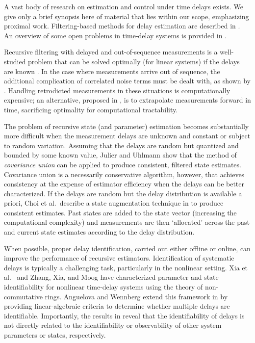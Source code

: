 \documentclass[letterpaper,10pt,conference]{ieeeconf}
\theoremstyle{definition}
\begin{document}
A vast body of research on estimation and control under time delays exists.
%
We give only a brief synopsis here of material that lies within our scope, emphasizing  proximal work. Filtering-based methods for delay estimation are described in .
%
An overview of some open problems in time-delay systems is provided in \cite{2003_Richard_Time-Delay}.

Recursive filtering with delayed and out-of-sequence measurements is a well-studied problem that can be solved optimally (for linear systems) if the delays are known \cite{2006_Simon_Optimal}.
%
In the case where measurements arrive out of sequence, the additional complication of correlated noise terms must be dealt with, as shown by \cite{1994_Thomopoulos_Decentralized}.
%
Handling retrodicted measurements in these situations is computationally expensive; an alternative, proposed in \cite{1998_Larsen_Incorporation}, is to extrapolate measurements forward in time, sacrificing optimality for computational tractability.

The problem of recursive state (and parameter) estimation becomes substantially more difficult when the measurement delays are unknown and constant or subject to random variation.
%
Assuming that the delays are random but quantized and bounded by some known value, Julier and Uhlmann \cite{2005_Julier_Fusion} show that the method of \emph{covariance union} can be applied to produce consistent, filtered state estimates.
%
Covariance union is a necessarily conservative algorithm, however, that achieves consistency at the expense of estimator efficiency when the delays can be better characterized.
%
If the delays are random but the delay distribution is available a priori, Choi et al.\ describe a state augmentation technique in \cite{2009_Choi_State} to produce consistent estimates. 
%
Past states are added to the state vector (increasing the computational complexity) and measurements are then `allocated' across the past and current state estimates according to the delay distribution.

When possible, proper delay identification, carried out either offline or online, can improve the performance of recursive estimators. 
% 
Identification of systematic delays is typically a challenging task, particularly in the  nonlinear setting. 
%
Xia et al.\ \cite{2002_Xia_Analysis} and Zhang, Xia, and Moog \cite{2006_Zhang_Parameter} have characterized parameter and state identifiability for nonlinear time-delay systems using the theory of non-commutative rings. 
%
Anguelova and Wennberg extend this framework in \cite{2007_Anguelova_State,2008_Anguelova_State} by providing linear-algebraic criteria to determine whether multiple delays are identifiable.
%
Importantly, the results in \cite{2008_Anguelova_State} reveal that the identifiability of  delays is not directly related to the identifiability or observability of other system parameters or states, respectively.
\end{document}
